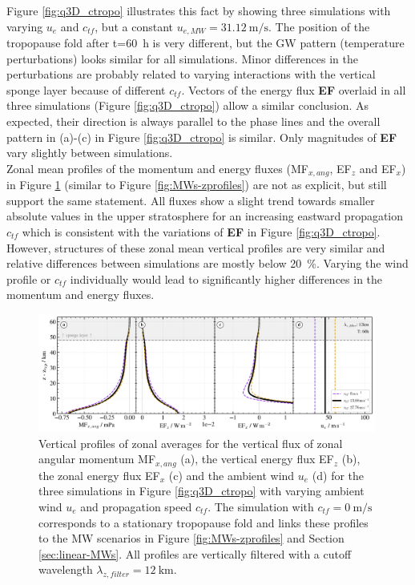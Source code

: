 %
Figure \ref{fig:q3D_ctropo} illustrates this fact by showing three simulations with varying $u_e$ and $c_{tf}$, but a constant $u_{e,MW}=\SI{31.12}{\meter\per\second}$. The position of the tropopause fold after t=\SI{60}{\hour} is very different, but the GW pattern (temperature perturbations) looks similar for all simulations. Minor differences in the perturbations are probably related to varying interactions with the vertical sponge layer because of different $c_{tf}$. Vectors of the energy flux \textbf{EF} overlaid in all three simulations (Figure \ref{fig:q3D_ctropo}) allow a similar conclusion. As expected, their direction is always parallel to the phase lines and the overall pattern in (a)-(c) in Figure \ref{fig:q3D_ctropo} is similar. Only magnitudes of \textbf{EF} vary slightly between simulations. \\
Zonal mean profiles of the momentum and energy fluxes (MF$_{x,ang}$, EF$_z$ and EF$_x$) in Figure \ref{fig:q3D_ctropo_vert} (similar to Figure \ref{fig:MWs-zprofiles}) are not as explicit, but still support the same statement. All fluxes show a slight trend towards smaller absolute values in the upper stratosphere for an increasing eastward propagation $c_{tf}$ which is consistent with the variations of \textbf{EF} in Figure \ref{fig:q3D_ctropo}. However, structures of these zonal mean vertical profiles are very similar and relative differences between simulations are mostly below \SI{20}{\percent}. Varying the wind profile or $c_{tf}$ individually would lead to significantly higher differences in the momentum and energy fluxes.\\
%
\begin{figure}[t]
    \centering
    \includegraphics[width=0.99\textwidth]{figures_q3D/TD-zprofiles-translbq3D_ctopo-T60h-avg.png}
    \caption{Vertical profiles of zonal averages for the vertical flux of zonal angular momentum MF$_{x,ang}$ (a), the vertical energy flux EF$_z$ (b), the zonal energy flux EF$_x$ (c) and the ambient wind $u_e$ (d) for the three simulations in Figure \ref{fig:q3D_ctropo} with varying ambient wind $u_e$ and propagation speed $c_{tf}$. The simulation with $c_{tf} = \SI{0}{\meter\per\second}$ corresponds to a stationary tropopause fold and links these profiles to the MW scenarios in Figure \ref{fig:MWs-zprofiles} and Section \ref{sec:linear-MWs}. All profiles are vertically filtered with a cutoff wavelength $\lambda_{z,filter}=\SI{12}{\kilo\meter}$.}
    \label{fig:q3D_ctropo_vert}
\end{figure}

